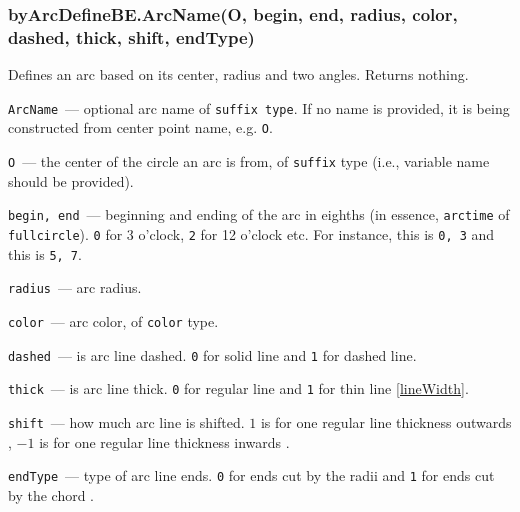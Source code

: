 \subsubsection{byArcDefineBE.ArcName(O, begin, end, radius, color, dashed, thick, shift, endType)}\label{byArcDefineBE}

	Defines an arc based on its center, radius and two angles. Returns nothing.

	
	\texttt{ArcName}~— optional arc name of \texttt{suffix type}. If no name is provided, it is being constructed from center point name, e.g. \texttt{O}.
	
	\texttt{O}~— the center of the circle an arc is from, of \texttt{suffix} type (i.e., variable name should be provided).
	
	\texttt{begin, end}~— beginning and ending of the arc in eighths (in essence, \texttt{arctime} of \texttt{fullcircle}). \texttt{0} for 3 o'clock, \texttt{2} for 12 o'clock etc. For instance, this
	is \texttt{0, 3} and this
	is \texttt{5, 7}.
	
	\texttt{radius}~— arc radius.
	
	\texttt{color}~— arc color, of \texttt{color} type.
	
	\texttt{dashed}~— is arc line dashed. \texttt{0} for solid line and \texttt{1} for dashed line.
	
	\texttt{thick}~— is arc line thick. \texttt{0} for regular line and \texttt{1} for thin line \ref{lineWidth}.
	
	\texttt{shift}~— how much arc line is shifted. \texttt{$1$} is for one regular line thickness outwards
	, \texttt{$-1$} is for one regular line thickness inwards
	.
	
	\texttt{endType}~— type of arc line ends. \texttt{0} for ends cut by the radii
	and \texttt{1} for ends cut by the chord
	.

